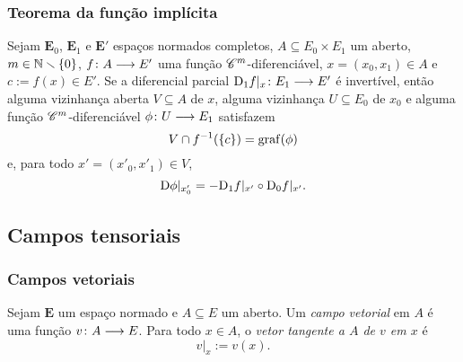 \subsubsection{Teorema da função implícita}

\begin{proposition}
Sejam $\bm E_0$, $\bm E_1$ e $\bm E'$ espaços normados completos, $A \subseteq E_0 \times E_1$ um aberto, $m \in \mathbb{N} \smallsetminus \{0\}$, ${f}\colon {A} \longrightarrow {E'}$ uma função $\mathscr{C}^m$-diferenciável, $x=(x_0,x_1) \in A$ e $c := f(x) \in E'$. Se a diferencial parcial ${\mathrm{D}_1 f|_{x}}\colon {E_1} \longrightarrow {E'}$ é invertível, então alguma vizinhança aberta $V \subseteq A$ de $x$,  alguma vizinhança $U \subseteq E_0$ de $x_0$ e alguma função $\mathscr{C}^m$-diferenciável ${\phi}\colon {U} \longrightarrow {E_1}$ satisfazem
	\begin{equation*}
	V \cap f^{-1}(\{c\}) = \operatorname{graf}(\phi)
	\end{equation*}
e, para todo $x'=(x'_0,x'_1) \in V$,
	\begin{equation*}
	\mathrm{D} \phi|_{x'_0} = - \mathrm{D}_1 f|_{x'} \circ \mathrm{D}_0 f|_{x'}.
	\end{equation*}
\end{proposition}


































\cleardoublepage

\subsection{Campos tensoriais}

\subsubsection{Campos vetoriais}

\begin{definition}
Sejam $\bm E$ um espaço normado e $A \subseteq E$ um aberto. Um \emph{campo vetorial} em $A$ é uma função ${v}\colon {A} \longrightarrow {E}$. Para todo $x \in A$, o \emph{vetor tangente a $A$ de $v$ em $x$} é
	\begin{equation*}
	v|_x := v(x).
	\end{equation*}
\end{definition}


